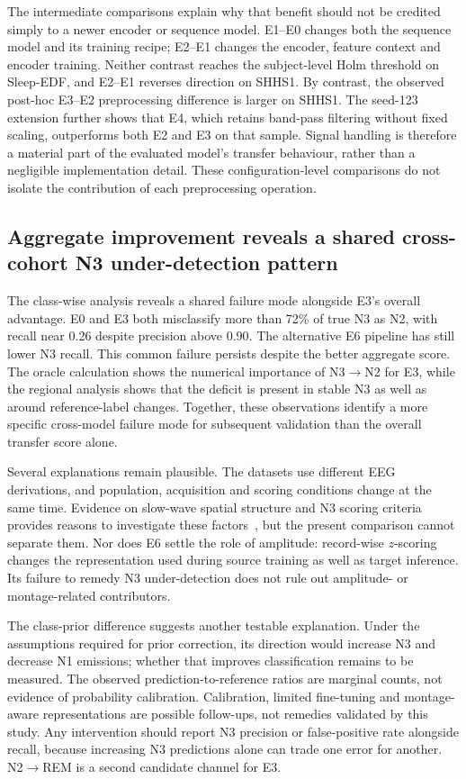 \documentclass[11pt,a4paper]{article}
\begin{document}
The intermediate comparisons explain why that benefit should not be credited simply to a newer
encoder or sequence model. E1--E0 changes both the sequence model and its training recipe;
E2--E1 changes the encoder, feature context and encoder training. Neither contrast reaches the
subject-level Holm threshold on Sleep-EDF, and E2--E1 reverses direction on SHHS1. By contrast,
the observed post-hoc E3--E2 preprocessing difference is larger on SHHS1. The seed-123 extension
further shows that E4, which retains band-pass filtering without fixed scaling, outperforms both E2
and E3 on that sample. Signal handling is therefore a material part of the evaluated model's transfer
behaviour, rather than a negligible implementation detail. These configuration-level comparisons do
not isolate the contribution of each preprocessing operation.

\subsection{Aggregate improvement reveals a shared cross-cohort N3 under-detection pattern}

The class-wise analysis reveals a shared failure mode alongside E3's overall advantage. E0 and E3 both
misclassify more than 72\% of true N3 as N2, with recall near 0.26 despite precision above 0.90.
The alternative E6 pipeline has still lower N3 recall. This common failure persists despite the better
aggregate score. The oracle calculation shows the numerical importance of
N3$\rightarrow$N2 for E3, while the regional analysis shows that the deficit is present in stable
N3 as well as around reference-label changes. Together, these observations identify a more specific
cross-model failure mode for subsequent validation than the overall transfer score alone.

Several explanations remain plausible. The datasets use different EEG derivations, and population,
acquisition and scoring conditions change at the same time. Evidence on slow-wave spatial structure
and N3 scoring criteria provides reasons to investigate these factors~\cite{massimini2004travelling,davidson2025n3},
but the present comparison cannot separate them. Nor does E6 settle the role of amplitude:
record-wise $z$-scoring changes the representation used during source training as well as target
inference. Its failure to remedy N3 under-detection does not rule out amplitude- or montage-related
contributors.

The class-prior difference suggests another testable explanation. Under the assumptions required for
prior correction, its direction would increase N3 and decrease N1 emissions; whether that improves
classification remains to be measured. The observed prediction-to-reference ratios are marginal
counts, not evidence of probability calibration. Calibration, limited fine-tuning and montage-aware
representations are possible follow-ups, not remedies validated by this study. Any intervention should
report N3 precision or false-positive rate alongside recall, because increasing N3 predictions alone
can trade one error for another. N2$\rightarrow$REM is a second candidate channel for E3.
\end{document}
